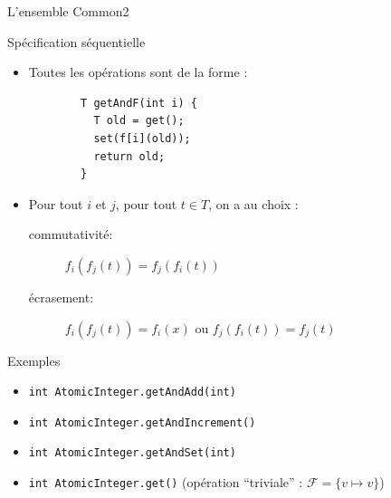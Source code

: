 
\begingroup

\begin{frame}[fragile]{L'ensemble Common2}
  \begin{block}{Spécification séquentielle}
    \begin{itemize}
    \item Toutes les opérations sont de la forme :
      \begin{lstlisting}
        T getAndF(int i) {
          T old = get();
          set(f[i](old));
          return old;
        }
      \end{lstlisting}
    \item Pour tout $i$ et $j$, pour tout $t\in T$, on a au choix : 
      \begin{description}
      \item[commutativité:] $f_i(f_j(t)) = f_j(f_i(t))$
      \item[écrasement:] $f_i(f_j(t)) = f_i(x)$ ou $f_j(f_i(t)) = f_j(t)$
      \end{description}
    \end{itemize}
  \end{block}
  \begin{exampleblock}{Exemples}
    \begin{itemize}
    \item \lstinline{int AtomicInteger.getAndAdd(int)}
    \item \lstinline{int AtomicInteger.getAndIncrement()}
    \item \lstinline{int AtomicInteger.getAndSet(int)}
    \item \lstinline{int AtomicInteger.get()} (opération ``triviale'' : $\mathcal{F} = \{v\mapsto v\}$)
    \end{itemize}
  \end{exampleblock}
\end{frame}

\endgroup
\endinput
